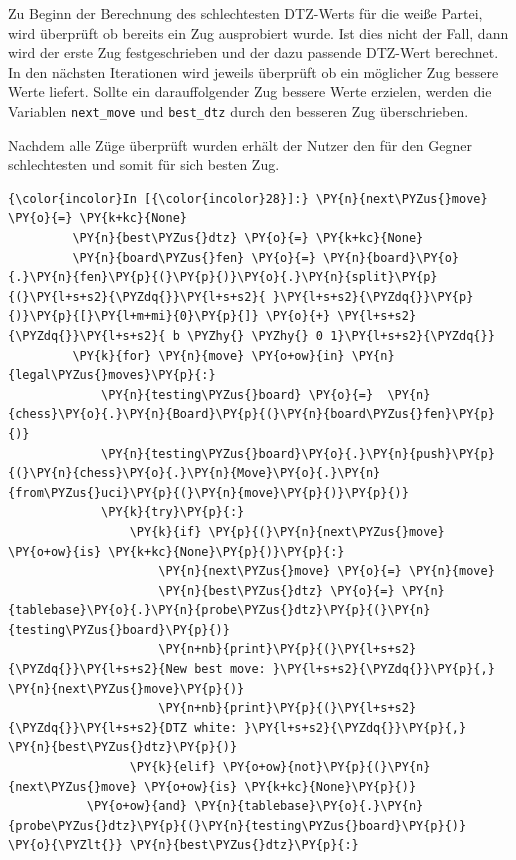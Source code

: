 Zu Beginn der Berechnung des schlechtesten DTZ-Werts für die weiße
Partei, wird überprüft ob bereits ein Zug ausprobiert wurde. Ist dies
nicht der Fall, dann wird der erste Zug festgeschrieben und der dazu
passende DTZ-Wert berechnet. In den nächsten Iterationen wird jeweils
überprüft ob ein möglicher Zug bessere Werte liefert. Sollte ein
darauffolgender Zug bessere Werte erzielen, werden die Variablen
\texttt{next\_move} und \texttt{best\_dtz} durch den besseren Zug
überschrieben.

Nachdem alle Züge überprüft wurden erhält der Nutzer den für den Gegner
schlechtesten und somit für sich besten Zug.

    \begin{Verbatim}[commandchars=\\\{\}]
{\color{incolor}In [{\color{incolor}28}]:} \PY{n}{next\PYZus{}move} \PY{o}{=} \PY{k+kc}{None}
         \PY{n}{best\PYZus{}dtz} \PY{o}{=} \PY{k+kc}{None}
         \PY{n}{board\PYZus{}fen} \PY{o}{=} \PY{n}{board}\PY{o}{.}\PY{n}{fen}\PY{p}{(}\PY{p}{)}\PY{o}{.}\PY{n}{split}\PY{p}{(}\PY{l+s+s2}{\PYZdq{}}\PY{l+s+s2}{ }\PY{l+s+s2}{\PYZdq{}}\PY{p}{)}\PY{p}{[}\PY{l+m+mi}{0}\PY{p}{]} \PY{o}{+} \PY{l+s+s2}{\PYZdq{}}\PY{l+s+s2}{ b \PYZhy{} \PYZhy{} 0 1}\PY{l+s+s2}{\PYZdq{}}
         \PY{k}{for} \PY{n}{move} \PY{o+ow}{in} \PY{n}{legal\PYZus{}moves}\PY{p}{:}
             \PY{n}{testing\PYZus{}board} \PY{o}{=}  \PY{n}{chess}\PY{o}{.}\PY{n}{Board}\PY{p}{(}\PY{n}{board\PYZus{}fen}\PY{p}{)}
             \PY{n}{testing\PYZus{}board}\PY{o}{.}\PY{n}{push}\PY{p}{(}\PY{n}{chess}\PY{o}{.}\PY{n}{Move}\PY{o}{.}\PY{n}{from\PYZus{}uci}\PY{p}{(}\PY{n}{move}\PY{p}{)}\PY{p}{)}
             \PY{k}{try}\PY{p}{:}
                 \PY{k}{if} \PY{p}{(}\PY{n}{next\PYZus{}move} \PY{o+ow}{is} \PY{k+kc}{None}\PY{p}{)}\PY{p}{:}
                     \PY{n}{next\PYZus{}move} \PY{o}{=} \PY{n}{move}
                     \PY{n}{best\PYZus{}dtz} \PY{o}{=} \PY{n}{tablebase}\PY{o}{.}\PY{n}{probe\PYZus{}dtz}\PY{p}{(}\PY{n}{testing\PYZus{}board}\PY{p}{)}
                     \PY{n+nb}{print}\PY{p}{(}\PY{l+s+s2}{\PYZdq{}}\PY{l+s+s2}{New best move: }\PY{l+s+s2}{\PYZdq{}}\PY{p}{,} \PY{n}{next\PYZus{}move}\PY{p}{)}
                     \PY{n+nb}{print}\PY{p}{(}\PY{l+s+s2}{\PYZdq{}}\PY{l+s+s2}{DTZ white: }\PY{l+s+s2}{\PYZdq{}}\PY{p}{,} \PY{n}{best\PYZus{}dtz}\PY{p}{)}
                 \PY{k}{elif} \PY{o+ow}{not}\PY{p}{(}\PY{n}{next\PYZus{}move} \PY{o+ow}{is} \PY{k+kc}{None}\PY{p}{)} 
		   \PY{o+ow}{and} \PY{n}{tablebase}\PY{o}{.}\PY{n}{probe\PYZus{}dtz}\PY{p}{(}\PY{n}{testing\PYZus{}board}\PY{p}{)} \PY{o}{\PYZlt{}} \PY{n}{best\PYZus{}dtz}\PY{p}{:}

\end{Verbatim}
